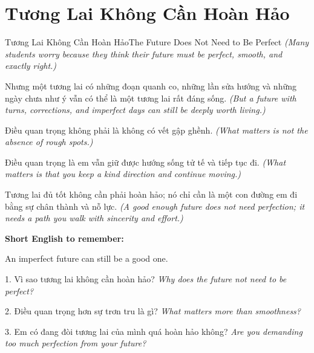 \section{Tương Lai Không Cần Hoàn Hảo}
\begin{truyen}{Tương Lai Không Cần Hoàn Hảo}{The Future Does Not Need to Be Perfect}
\textit{(Many students worry because they think their future must be perfect, smooth, and exactly right.)}

Nhưng một tương lai có những đoạn quanh co, những lần sửa hướng và những ngày chưa như ý vẫn có thể là một tương lai rất đáng sống.
\textit{(But a future with turns, corrections, and imperfect days can still be deeply worth living.)}

Điều quan trọng không phải là không có vết gập ghềnh.
\textit{(What matters is not the absence of rough spots.)}

Điều quan trọng là em vẫn giữ được hướng sống tử tế và tiếp tục đi.
\textit{(What matters is that you keep a kind direction and continue moving.)}
\end{truyen}

\begin{baihoc}
Tương lai đủ tốt không cần phải hoàn hảo; nó chỉ cần là một con đường em đi bằng sự chân thành và nỗ lực.
\textit{(A good enough future does not need perfection; it needs a path you walk with sincerity and effort.)}
\end{baihoc}

\begin{ghinhoanh}
\textbf{Short English to remember:}

An imperfect future can still be a good one.

\end{ghinhoanh}

\begin{tuhocnhanh}
1. Vì sao tương lai không cần hoàn hảo? \textit{Why does the future not need to be perfect?}

2. Điều quan trọng hơn sự trơn tru là gì? \textit{What matters more than smoothness?}

3. Em có đang đòi tương lai của mình quá hoàn hảo không? \textit{Are you demanding too much perfection from your future?}
\end{tuhocnhanh}
\ngancach